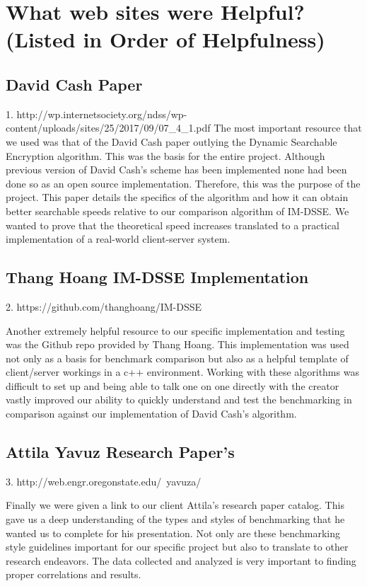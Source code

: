 \clearpage

\section{ What web sites were Helpful? (Listed in Order of Helpfulness)}

\subsection{David Cash Paper}
1. http://wp.internetsociety.org/ndss/wp-content/uploads/sites/25/2017/09/07_4_1.pdf
The most important resource that we used was that of the David Cash paper outlying the Dynamic Searchable Encryption algorithm. This was the basis for the entire project. Although previous version of David Cash’s scheme has been implemented none had been done so as an open source implementation. Therefore, this was the purpose of the project. This paper details the specifics of the algorithm and how it can obtain better searchable speeds relative to our comparison algorithm of IM-DSSE. We wanted to prove that the theoretical speed increases translated to a practical implementation of a real-world client-server system.

\subsection{Thang Hoang IM-DSSE Implementation}
2. https://github.com/thanghoang/IM-DSSE

Another extremely helpful resource to our specific implementation and testing was the Github repo provided by Thang Hoang. This implementation was used not only as a basis for benchmark comparison but also as a helpful template of client/server workings in a c++ environment. Working with these algorithms was difficult to set up and being able to talk one on one directly with the creator vastly improved our ability to quickly understand and test the benchmarking in comparison against our implementation of David Cash’s algorithm.

\subsection{Attila Yavuz Research Paper's}
3. http://web.engr.oregonstate.edu/~yavuza/

Finally we were given a link to our client Attila’s research paper catalog. This gave us a deep understanding of the types and styles of benchmarking that he wanted us to complete for his presentation. Not only are these benchmarking style guidelines important for our specific project but also to translate to other research endeavors. The data collected and analyzed is very important to finding proper correlations and results.

